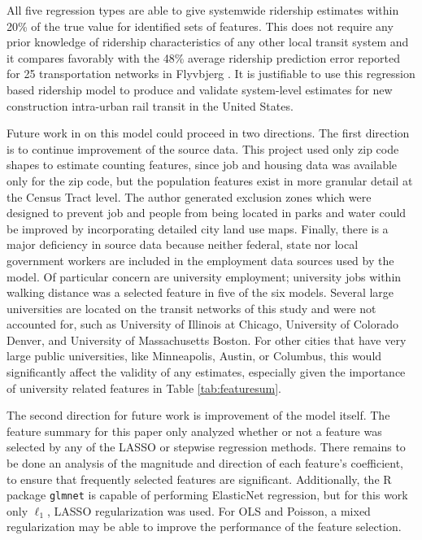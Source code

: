 \documentclass[11pt]{article}
\begin{document}
All five regression types are able to give systemwide ridership estimates within 20\% of the true value for identified sets of features. This does not require any prior knowledge of ridership characteristics of any other local transit system and it compares favorably with the 48\% average ridership prediction  error reported for 25 transportation networks in Flyvbjerg \cite{Flyvbjerg2006}. It is justifiable to use this regression based ridership model to produce and validate system-level estimates for new construction intra-urban rail transit in the United States. 

Future work in on this model could proceed in two directions. The first direction is to continue improvement of the source data. This project used only zip code shapes to estimate counting features, since job and housing data was available only for the zip code, but the population features exist in more granular detail at the Census Tract level. The author generated exclusion zones which were designed to prevent job and people from being located in parks and water could be improved by incorporating detailed city land use maps. Finally, there is a major deficiency in source data because neither federal, state nor local government workers are included in the employment data sources used by the model. Of particular concern are university employment; university jobs within walking distance was a selected feature in five of the six models. Several large universities are located on the transit networks of this study and were not accounted for, such as University of Illinois at Chicago, University of Colorado  Denver, and University of Massachusetts Boston. For other cities that have very large public universities, like Minneapolis, Austin, or Columbus, this would significantly affect the validity of any estimates, especially given the importance of university related features in Table \ref{tab:featuresum}.

The second direction for future work is improvement of the model itself. The feature summary for this paper only analyzed whether or not a feature was selected by any of the LASSO or stepwise regression methods. There remains to be done an analysis of the magnitude and direction of each feature's coefficient, to ensure that frequently selected features are significant. Additionally, the R package \texttt{glmnet} is capable of performing ElasticNet regression, but for this work only $\ell_1$, LASSO regularization was used. For OLS and Poisson, a mixed regularization may be able to improve the performance of the feature selection. 
\end{document}
